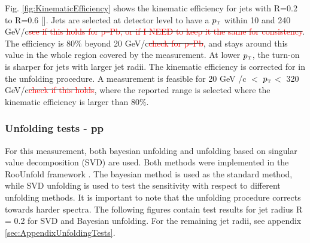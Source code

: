 \documentclass[ALICE]{ALICE_analysis_notes}
\newcommand{\pT}{$p_{\mbox{\tiny T}}$\xspace}
\newcommand{\pPb}{{\mbox{p--Pb}}\xspace}
\newcommand{\pp}{pp\xspace}
\providecommand{\DIFaddtex}[1]{{\protect\color{blue}\uwave{#1}}} %
\providecommand{\DIFdeltex}[1]{{\protect\color{red}\sout{#1}}}                      %
\providecommand{\DIFaddbegin}{} %
\providecommand{\DIFaddend}{} %
\providecommand{\DIFdelbegin}{} %
\providecommand{\DIFdelend}{} %
\providecommand{\DIFadd}[1]{\texorpdfstring{\DIFaddtex{#1}}{#1}} %
\providecommand{\DIFdel}[1]{\texorpdfstring{\DIFdeltex{#1}}{}} %
\newcommand{\DIFscaledelfig}{0.5}
\newlength{\DIFdelgraphicswidth} %
\newlength{\DIFdelgraphicsheight} %
\newcommand{\DIFaddincludegraphics}[2][]{{\color{blue}\fbox{\DIFOincludegraphics[#1]{#2}}}} %
\newcommand{\DIFdelincludegraphics}[2][]{%
\sbox{\DIFdelgraphicsbox}{\DIFOincludegraphics[#1]{#2}}%
\settoboxwidth{\DIFdelgraphicswidth}{\DIFdelgraphicsbox} %
\settoboxtotalheight{\DIFdelgraphicsheight}{\DIFdelgraphicsbox} %
\scalebox{\DIFscaledelfig}{%
\parbox[b]{\DIFdelgraphicswidth}{\usebox{\DIFdelgraphicsbox}\\[-\baselineskip] \rule{\DIFdelgraphicswidth}{0em}}\llap{\resizebox{\DIFdelgraphicswidth}{\DIFdelgraphicsheight}{%
\setlength{\unitlength}{\DIFdelgraphicswidth}%
\begin{picture}(1,1)%
\thicklines\linethickness{2pt} %
{\color[rgb]{1,0,0}\put(0,0){\framebox(1,1){}}}%
{\color[rgb]{1,0,0}\put(0,0){\line( 1,1){1}}}%
{\color[rgb]{1,0,0}\put(0,1){\line(1,-1){1}}}%
\end{picture}%
}\hspace*{3pt}}} %
} %
\DeclareRobustCommand{\DIFaddbegin}{\DIFOaddbegin \let\includegraphics\DIFaddincludegraphics} %
\DeclareRobustCommand{\DIFaddend}{\DIFOaddend \let\includegraphics\DIFOincludegraphics} %
\DeclareRobustCommand{\DIFdelbegin}{\DIFOdelbegin \let\includegraphics\DIFdelincludegraphics} %
\DeclareRobustCommand{\DIFdelend}{\DIFOaddend \let\includegraphics\DIFOincludegraphics} %
\begin{document}
Fig. \ref{fig:KinematicEfficiency} shows the kinematic efficiency for jets with R=0.2 to R=0.6 \DIFaddbegin [\DIFadd{0.5}]\DIFaddend . Jets are selected at detector level to have a \pT within 10 and 240 GeV/c\DIFdelbegin \DIFdel{\textcolor{red}{see if this holds for \pPb, or if I NEED to keep it the same for consistency}}\DIFdelend . The efficiency is 80$\%$ beyond 20 GeV/c\DIFdelbegin \DIFdel{\textcolor{red}{check for \pPb}}\DIFdelend , and stays around this value in the whole region covered by the measurement. At lower \pT, the turn-on is sharper for jets with larger jet radii. The kinematic efficiency is corrected for in the unfolding procedure. A measurement is feasible for 20 GeV /c $<$ \pT $<$ 320 GeV/c\DIFdelbegin \DIFdel{\textcolor{red}{check if this holds}}\DIFdelend , where the reported range is selected where the kinematic efficiency is larger than 80$\%$.

\subsubsection{Unfolding tests - \pp}
\label{subsec:unfoldingTests}

For this measurement, both bayesian unfolding and unfolding based on singular value decomposition (SVD) are used. Both methods were implemented in the RooUnfold framework \cite{roounfold}. The bayesian method is used as the standard method, while SVD unfolding is used to test the sensitivity with respect to different unfolding methods. It is important to note that the unfolding procedure corrects towards harder spectra. The following figures contain test results for jet radius R = 0.2 for SVD and Bayesian unfolding. For the remaining jet radii, see appendix \ref{sec:AppendixUnfoldingTests}.
\end{document}
